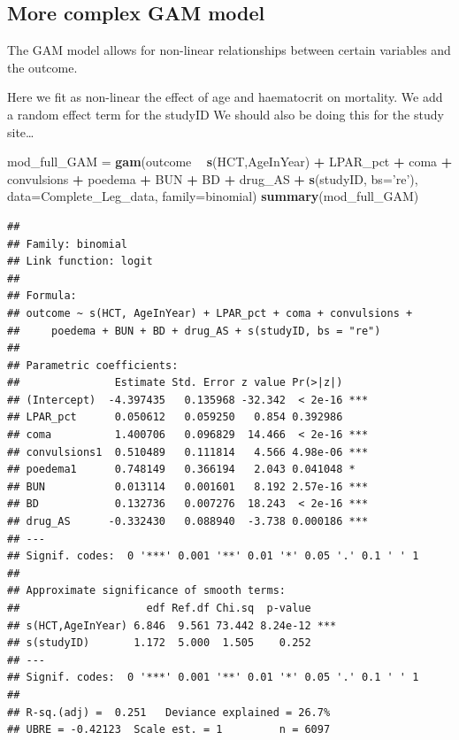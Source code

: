 \documentclass[]{article}
\newenvironment{Shaded}{\begin{snugshade}}{\end{snugshade}}
\newcommand{\KeywordTok}[1]{\textcolor[rgb]{0.13,0.29,0.53}{\textbf{#1}}}
\newcommand{\DataTypeTok}[1]{\textcolor[rgb]{0.13,0.29,0.53}{#1}}
\newcommand{\StringTok}[1]{\textcolor[rgb]{0.31,0.60,0.02}{#1}}
\newcommand{\OperatorTok}[1]{\textcolor[rgb]{0.81,0.36,0.00}{\textbf{#1}}}
\newcommand{\NormalTok}[1]{#1}
\begin{document}
\subsection{More complex GAM model}\label{more-complex-gam-model}

The GAM model allows for non-linear relationships between certain
variables and the outcome.

Here we fit as non-linear the effect of age and haematocrit on
mortality. We add a random effect term for the studyID We should also be
doing this for the study site\ldots{}

\begin{Shaded}
\begin{Highlighting}[]
\NormalTok{mod_full_GAM =}\StringTok{ }\KeywordTok{gam}\NormalTok{(outcome }\OperatorTok{~}\StringTok{ }\KeywordTok{s}\NormalTok{(HCT,AgeInYear) }\OperatorTok{+}\StringTok{ }\NormalTok{LPAR_pct  }\OperatorTok{+}\StringTok{ }\NormalTok{coma }\OperatorTok{+}\StringTok{ }\NormalTok{convulsions }\OperatorTok{+}
\StringTok{                   }\NormalTok{poedema }\OperatorTok{+}\StringTok{ }\NormalTok{BUN }\OperatorTok{+}\StringTok{ }\NormalTok{BD }\OperatorTok{+}\StringTok{ }\NormalTok{drug_AS }\OperatorTok{+}\StringTok{ }\KeywordTok{s}\NormalTok{(studyID, }\DataTypeTok{bs=}\StringTok{'re'}\NormalTok{),}
               \DataTypeTok{data=}\NormalTok{Complete_Leg_data, }\DataTypeTok{family=}\NormalTok{binomial)}
\KeywordTok{summary}\NormalTok{(mod_full_GAM)}
\end{Highlighting}
\end{Shaded}

\begin{verbatim}
## 
## Family: binomial 
## Link function: logit 
## 
## Formula:
## outcome ~ s(HCT, AgeInYear) + LPAR_pct + coma + convulsions + 
##     poedema + BUN + BD + drug_AS + s(studyID, bs = "re")
## 
## Parametric coefficients:
##               Estimate Std. Error z value Pr(>|z|)    
## (Intercept)  -4.397435   0.135968 -32.342  < 2e-16 ***
## LPAR_pct      0.050612   0.059250   0.854 0.392986    
## coma          1.400706   0.096829  14.466  < 2e-16 ***
## convulsions1  0.510489   0.111814   4.566 4.98e-06 ***
## poedema1      0.748149   0.366194   2.043 0.041048 *  
## BUN           0.013114   0.001601   8.192 2.57e-16 ***
## BD            0.132736   0.007276  18.243  < 2e-16 ***
## drug_AS      -0.332430   0.088940  -3.738 0.000186 ***
## ---
## Signif. codes:  0 '***' 0.001 '**' 0.01 '*' 0.05 '.' 0.1 ' ' 1
## 
## Approximate significance of smooth terms:
##                    edf Ref.df Chi.sq  p-value    
## s(HCT,AgeInYear) 6.846  9.561 73.442 8.24e-12 ***
## s(studyID)       1.172  5.000  1.505    0.252    
## ---
## Signif. codes:  0 '***' 0.001 '**' 0.01 '*' 0.05 '.' 0.1 ' ' 1
## 
## R-sq.(adj) =  0.251   Deviance explained = 26.7%
## UBRE = -0.42123  Scale est. = 1         n = 6097
\end{verbatim}
\end{document}
